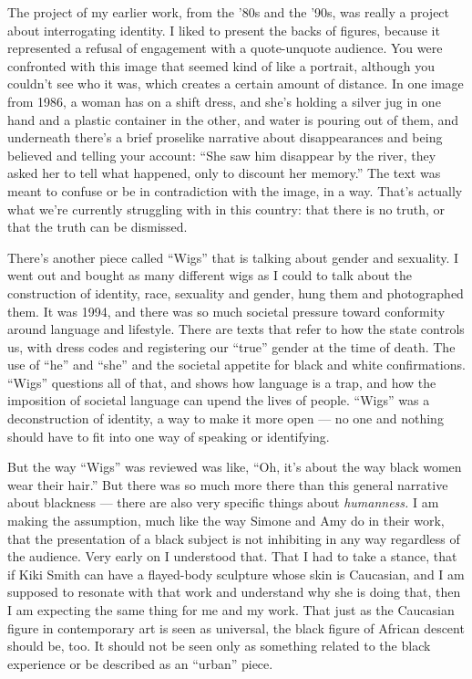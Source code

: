 The project of my earlier work, from the '80s and the '90s, was really a
project about interrogating identity. I liked to present the backs of
figures, because it represented a refusal of engagement with a
quote-unquote audience. You were confronted with this image that seemed
kind of like a portrait, although you couldn't see who it was, which
creates a certain amount of distance. In one image from 1986, a woman
has on a shift dress, and she's holding a silver jug in one hand and a
plastic container in the other, and water is pouring out of them, and
underneath there's a brief proselike narrative about disappearances and
being believed and telling your account: ``She saw him disappear by the
river, they asked her to tell what happened, only to discount her
memory.'' The text was meant to confuse or be in contradiction with the
image, in a way. That's actually what we're currently struggling with in
this country: that there is no truth, or that the truth can be
dismissed.

There's another piece called ``Wigs'' that is talking about gender and
sexuality. I went out and bought as many different wigs as I could to
talk about the construction of identity, race, sexuality and gender,
hung them and photographed them. It was 1994, and there was so much
societal pressure toward conformity around language and lifestyle. There
are texts that refer to how the state controls us, with dress codes and
registering our ``true'' gender at the time of death. The use of ``he''
and ``she'' and the societal appetite for black and white confirmations.
``Wigs'' questions all of that, and shows how language is a trap, and
how the imposition of societal language can upend the lives of people.
``Wigs'' was a deconstruction of identity, a way to make it more open
--- no one and nothing should have to fit into one way of speaking or
identifying.

But the way ``Wigs'' was reviewed was like, ``Oh, it's about the way
black women wear their hair.'' But there was so much more there than
this general narrative about blackness --- there are also very specific
things about \emph{humanness.} I am making the assumption, much like the
way Simone and Amy do in their work, that the presentation of a black
subject is not inhibiting in any way regardless of the audience. Very
early on I understood that. That I had to take a stance, that if Kiki
Smith can have a flayed-body sculpture whose skin is Caucasian, and I am
supposed to resonate with that work and understand why she is doing
that, then I am expecting the same thing for me and my work. That just
as the Caucasian figure in contemporary art is seen as universal, the
black figure of African descent should be, too. It should not be seen
only as something related to the black experience or be described as an
``urban'' piece.

